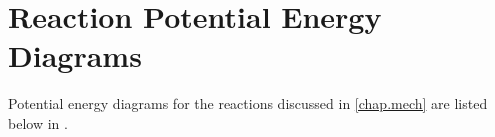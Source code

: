 \chapter{Reaction Potential Energy Diagrams} \label{app.energy}

Potential energy diagrams for the reactions discussed in \autoref{chap.mech} are listed below in \Cref{}. 

